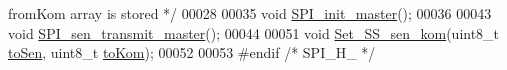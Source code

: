 \begin{DoxyCode}
{       fromKom array is stored */}
00028 
00035 \textcolor{keywordtype}{void} \hyperlink{styr_2styr_2_s_p_i_8h_a49ddfef1b082be9cebd28e4bbebf247d}{SPI\_init\_master}();
00036 
00043 \textcolor{keywordtype}{void} \hyperlink{styr_2styr_2_s_p_i_8h_aef55913736b574735fdfca21de557988}{SPI\_sen\_transmit\_master}();
00044 
00051 \textcolor{keywordtype}{void} \hyperlink{styr_2styr_2_s_p_i_8h_a21ae89e79b07cfb95e2674541cf5ee27}{Set\_SS\_sen\_kom}(uint8\_t \hyperlink{styr_2styr_2_s_p_i_8c_a877332cdcfad9d61a433fda50f5fb1b5}{toSen}, uint8\_t \hyperlink{styr_2styr_2_s_p_i_8c_ae9f07651aa8c38a27c260082879ab9b2}{toKom});
00052 
00053 \textcolor{preprocessor}{#endif }\textcolor{comment}{/* SPI\_H\_ */}\textcolor{preprocessor}{}
\end{DoxyCode}
